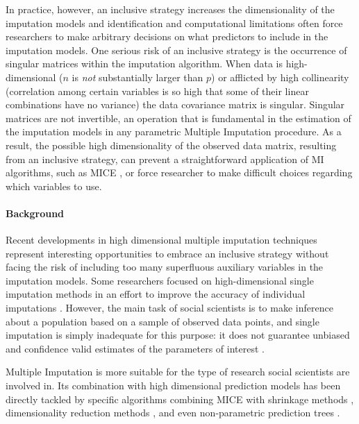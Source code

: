 In practice, however, an inclusive strategy increases the dimensionality of the imputation models 
and identification and computational limitations often force researchers to make arbitrary decisions on what 
predictors to include in the imputation models.
One serious risk of an inclusive strategy is the occurrence of singular matrices within the imputation algorithm.
When data is high-dimensional ($n$ is \emph{not} substantially larger than $p$) or afflicted by high collinearity 
(correlation among certain variables is so high that some of their linear combinations have no variance) the data 
covariance matrix is singular. 
Singular matrices are not invertible, an operation that is fundamental in the estimation of the imputation 
models in any parametric Multiple Imputation procedure.
As a result, the possible high dimensionality of the observed data matrix, resulting from an inclusive strategy, 
can prevent a straightforward application of MI algorithms, such as MICE \citep{vanBuuren:2012}, or force
researcher to make difficult choices regarding which variables to use.

\paragraph{Background}
Recent developments in high dimensional multiple imputation techniques represent interesting 
opportunities to embrace an inclusive strategy without facing the risk of including too many superfluous 
auxiliary variables in the imputation models. 
Some researchers focused on high-dimensional single imputation methods in an effort to improve the 
accuracy of individual imputations \citep{kimEtAl:2005, stekhovenBuhlmann:2011, d'ambrosioEtAl:2012}. 
However, the main task of social scientists is to make inference about a population based on a sample of observed 
data points, and single imputation is simply inadequate for this purpose: it does not guarantee unbiased and confidence 
valid estimates of the parameters of interest \citep{rubin:1996}.

Multiple Imputation is more suitable for the type of research social scientists are involved in. 
Its combination with high dimensional prediction models has been directly tackled by specific algorithms combining MICE 
with shrinkage methods \citep{zhaoLong:2016, dengEtAl:2016}, dimensionality reduction methods \citep{songBelin:2004, 
howardEtAl:2015}, and even non-parametric prediction trees \citep{reiter:2005, burgetteReiter:2010, dooveEtAl:2014, 
shahEtAl:2014}.

